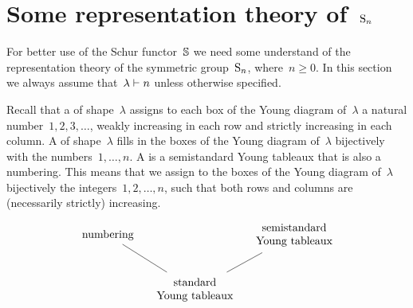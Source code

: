 \documentclass[a4paper,10pt]{scrartcl}
\begin{document}





\section{Some representation theory of~$\operatorname{S}_n$}

For better use of the Schur functor~$\mathbb{S}$ we need some understand of the representation theory of the symmetric group~$\operatorname{S}_n$, where~$n \geq 0$.
In this section we always assume that~$\lambda \vdash n$ unless otherwise specified.

Recall that a  of shape~$\lambda$ assigns to each box of the Young diagram of~$\lambda$ a natural number~$1, 2, 3, \dotsc$, weakly increasing in each row and strictly increasing in each column.
A  of shape~$\lambda$ fills in the boxes of the Young diagram of~$\lambda$ bijectively with the numbers~$1, \dotsc, n$.
A  is a semistandard Young tableaux that is also a numbering.
This means that we assign to the boxes of the Young diagram of~$\lambda$ bijectively the integers~$1, 2, \dotsc, n$, such that both rows and columns are (necessarily strictly) increasing.
\[
  \begin{tikzcd}[column sep = small]
    \text{numbering}
    \arrow[dash]{dr}
    &
    {}
    &
    \begin{tabular}{@{}c@{}}
      semistandard \\
      Young tableaux
    \end{tabular}
    \arrow[dash]{dl}
    \\
    {}
    &
    \begin{tabular}{@{}c@{}}
      standard \\
      Young tableaux
    \end{tabular}
    &
    {}
  \end{tikzcd}
\]
\end{document}
